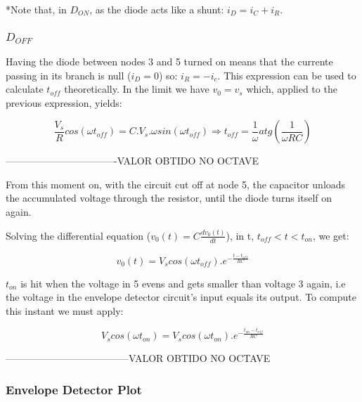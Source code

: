 *Note that, in $D_{ON}$, as the diode acts like a shunt: $i_D = i_C + i_R$.

\subsubsection{$D_{OFF}$}

Having the diode between nodes 3 and 5 turned on means that the currente passing in its branch is null ($i_D = 0 $) so: $i_R = -i_c$. This expression can be used to calculate $t_{off}$ theoretically. In the limit we have $v_0 = v_s$ which, applied to the previous expression, yields:


\begin{center}
\begin{equation}
	\frac{V_{s}}{R} cos(\omega t_{off}) = C.V_s.\omega sin(\omega t_{off}) \Rightarrow t_{off} = \frac{1}{\omega} atg(\frac{1}{\omega RC})
\end{equation}
\end{center}

----------------------------------VALOR OBTIDO NO OCTAVE

From this moment on, with the circuit cut off at node 5, the capacitor unloads the accumulated voltage through the resistor, until the diode turns itself on again.\par

Solving the differential equation ($v_0(t) = C\frac{dv_0(t)}{dt}$), in t, $t_{off} < t < t_{on}$, we get:

\begin{center}
\begin{equation}
	v_0(t) = V_s cos(\omega t_{off}).e^{-\frac{ t-t_{off} }{RC}}
\end{equation}
\end{center}


$t_{on}$ is hit when the voltage in 5 evens and gets smaller than voltage 3 again, i.e the voltage in the envelope detector circuit's input equals its output. To compute this instant we must apply:

\begin{center}
\begin{equation}
	 V_s cos(\omega t_{on}) = V_s cos(\omega t_{on}).e^{-\frac{ t_{on}-t_{off} }{RC}}
\end{equation}
\end{center}

--------------------------------------VALOR OBTIDO NO OCTAVE

\subsubsection{Envelope Detector Plot}

